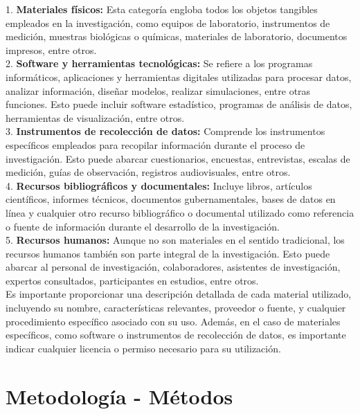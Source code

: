 \documentclass[12pt,a4paper,oneside]{report}
\begin{document}
1. \textbf{Materiales físicos:} Esta categoría engloba todos los objetos tangibles empleados en la investigación, como equipos de laboratorio, instrumentos de medición, muestras biológicas o químicas, materiales de laboratorio, documentos impresos, entre otros.\\

2. \textbf{Software y herramientas tecnológicas:} Se refiere a los programas informáticos, aplicaciones y herramientas digitales utilizadas para procesar datos, analizar información, diseñar modelos, realizar simulaciones, entre otras funciones. Esto puede incluir software estadístico, programas de análisis de datos, herramientas de visualización, entre otros.\\

3. \textbf{Instrumentos de recolección de datos:} Comprende los instrumentos específicos empleados para recopilar información durante el proceso de investigación. Esto puede abarcar cuestionarios, encuestas, entrevistas, escalas de medición, guías de observación, registros audiovisuales, entre otros.\\

4. \textbf{Recursos bibliográficos y documentales:} Incluye libros, artículos científicos, informes técnicos, documentos gubernamentales, bases de datos en línea y cualquier otro recurso bibliográfico o documental utilizado como referencia o fuente de información durante el desarrollo de la investigación.\\

5. \textbf{Recursos humanos:} Aunque no son materiales en el sentido tradicional, los recursos humanos también son parte integral de la investigación. Esto puede abarcar al personal de investigación, colaboradores, asistentes de investigación, expertos consultados, participantes en estudios, entre otros.\\

Es importante proporcionar una descripción detallada de cada material utilizado, incluyendo su nombre, características relevantes, proveedor o fuente, y cualquier procedimiento específico asociado con su uso. Además, en el caso de materiales específicos, como software o instrumentos de recolección de datos, es importante indicar cualquier licencia o permiso necesario para su utilización.\\


\section{Metodología - Métodos}
\end{document}
